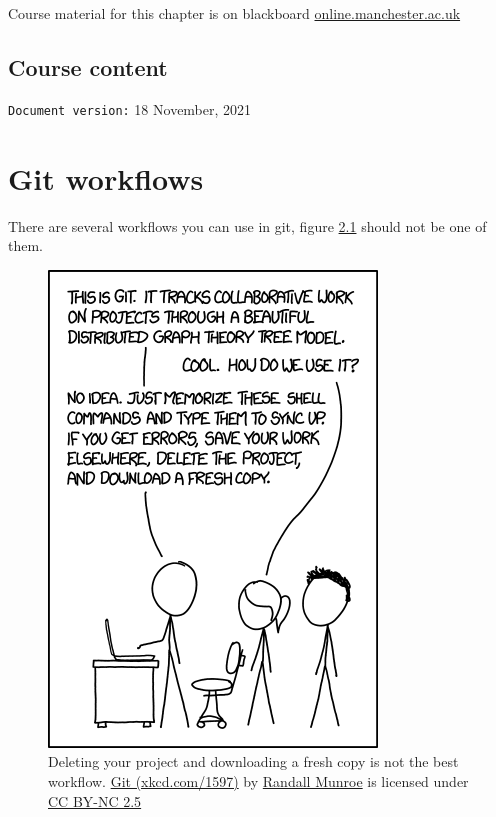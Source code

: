 \documentclass[
]{book}
\begin{document}
Course material for this chapter is on blackboard \href{https://online.manchester.ac.uk}{online.manchester.ac.uk}

\hypertarget{course-content-1}{%
\section{Course content}\label{course-content-1}}

\texttt{Document\ version:} 18 November, 2021

\hypertarget{flowing}{%
\chapter{Git workflows}\label{flowing}}

There are several workflows you can use in git, figure \ref{fig:xkcd-git-fig} should not be one of them.

\begin{figure}

{\centering \includegraphics[width=0.55\linewidth]{images/git} 

}

\caption{Deleting your project and downloading a fresh copy is not the best workflow. \href{https://xkcd.com/1597/}{Git (xkcd.com/1597)} by \href{https://en.wikipedia.org/wiki/Randall_Munroe}{Randall Munroe} is licensed under \href{https://creativecommons.org/licenses/by-nc/2.5/}{CC BY-NC 2.5}}\label{fig:xkcd-git-fig}
\end{figure}
\end{document}

